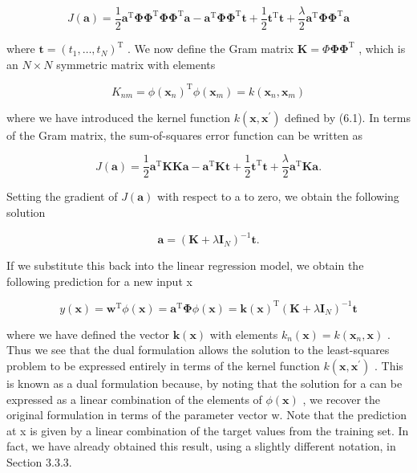 \documentclass[
  10
]{article}
\begin{document}
\[
J (\mathbf {a}) = \frac {1}{2} \mathbf {a} ^ {\mathrm{T}} \boldsymbol {\Phi} \boldsymbol {\Phi} ^ {\mathrm{T}} \boldsymbol {\Phi} \boldsymbol {\Phi} ^ {\mathrm{T}} \mathbf {a} - \mathbf {a} ^ {\mathrm{T}} \boldsymbol {\Phi} \boldsymbol {\Phi} ^ {\mathrm{T}} \mathbf {t} + \frac {1}{2} \mathbf {t} ^ {\mathrm{T}} \mathbf {t} + \frac {\lambda}{2} \mathbf {a} ^ {\mathrm{T}} \boldsymbol {\Phi} \boldsymbol {\Phi} ^ {\mathrm{T}} \mathbf {a}\tag{6.5}
\]

where
\(\mathbf { t } = ( t _ { 1 } , \ldots , t _ { N } ) ^ { \mathrm { T } }\)
. We now define the Gram matrix
\(\mathbf { K } = \Phi \mathbf { \Phi } \mathbf { \Phi } ^ { \mathrm { T } }\)
, which is an \(N \times N\) symmetric matrix with elements

\[
K _ {n m} = \phi (\mathbf {x} _ {n}) ^ {\mathrm{T}} \phi (\mathbf {x} _ {m}) = k (\mathbf {x} _ {n}, \mathbf {x} _ {m})\tag{6.6}
\]

where we have introduced the kernel function
\(k ( \mathbf { x } , \mathbf { x } ^ { \prime } )\) defined by (6.1).
In terms of the Gram matrix, the sum-of-squares error function can be
written as

\[
J (\mathbf {a}) = \frac {1}{2} \mathbf {a} ^ {\mathrm{T}} \mathbf {K K a} - \mathbf {a} ^ {\mathrm{T}} \mathbf {K t} + \frac {1}{2} \mathbf {t} ^ {\mathrm{T}} \mathbf {t} + \frac {\lambda}{2} \mathbf {a} ^ {\mathrm{T}} \mathbf {K a}.\tag{6.7}
\]

Setting the gradient of \(J ( \mathbf { a } )\) with respect to a to
zero, we obtain the following solution

\[
\mathbf {a} = \left(\mathbf {K} + \lambda \mathbf {I} _ {N}\right) ^ {- 1} \mathbf {t}.\tag{6.8}
\]

If we substitute this back into the linear regression model, we obtain
the following prediction for a new input x

\[
y (\mathbf {x}) = \mathbf {w} ^ {\mathrm{T}} \phi (\mathbf {x}) = \mathbf {a} ^ {\mathrm{T}} \boldsymbol {\Phi} \phi (\mathbf {x}) = \mathbf {k} (\mathbf {x}) ^ {\mathrm{T}} \left(\mathbf {K} + \lambda \mathbf {I} _ {N}\right) ^ {- 1} \mathbf {t}\tag{6.9}
\]

where we have defined the vector \(\mathbf { k } ( \mathbf { x } )\)
with elements
\(k _ { n } ( \mathbf { x } ) = k ( \mathbf { x } _ { n } , \mathbf { x } )\)
. Thus we see that the dual formulation allows the solution to the
least-squares problem to be expressed entirely in terms of the kernel
function \(k ( \mathbf { x } , \mathbf { x } ^ { \prime } )\) . This is
known as a dual formulation because, by noting that the solution for a
can be expressed as a linear combination of the elements of
\(\phi ( \mathbf { x } )\) , we recover the original formulation in
terms of the parameter vector w. Note that the prediction at x is given
by a linear combination of the target values from the training set. In
fact, we have already obtained this result, using a slightly different
notation, in Section 3.3.3.
\end{document}
